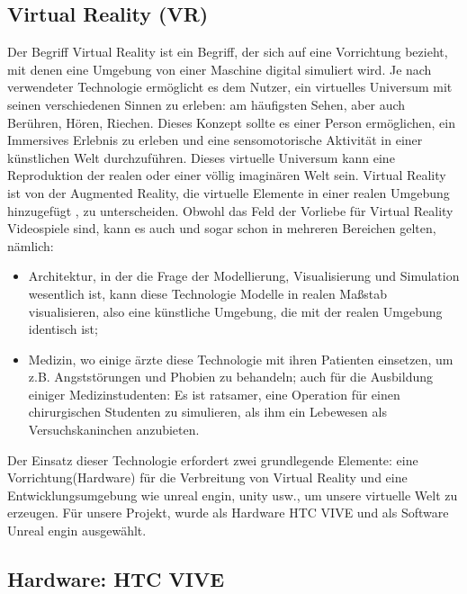 \subsection{Virtual Reality (VR)} \label{grund-vr}


Der Begriff Virtual Reality ist ein Begriff, der sich auf eine Vorrichtung bezieht, mit denen eine Umgebung von einer Maschine digital simuliert wird. 
Je nach verwendeter Technologie erm{\"o}glicht es dem Nutzer, ein virtuelles Universum mit seinen verschiedenen Sinnen zu erleben: 
am h{\"a}ufigsten Sehen, aber auch Ber{\"u}hren, H{\"o}ren, Riechen. 
Dieses Konzept sollte es einer Person erm{\"o}glichen, ein Immersives Erlebnis zu erleben und eine sensomotorische Aktivit{\"a}t in einer k{\"u}nstlichen Welt durchzuf{\"u}hren. 
Dieses virtuelle Universum kann eine Reproduktion der realen oder einer v{\"o}llig imagin{\"a}ren Welt sein. 
Virtual Reality ist von der Augmented Reality, die virtuelle Elemente in einer realen Umgebung hinzugef{\"u}gt , zu unterscheiden.
Obwohl das Feld der Vorliebe f{\"u}r Virtual Reality Videospiele sind, kann es auch und sogar schon in mehreren Bereichen gelten, n{\"a}mlich\cite{kolb18}:


\begin{itemize} \setlength\itemsep{-0.15cm}
  \item Architektur, in der die Frage der Modellierung, Visualisierung und Simulation wesentlich ist, kann diese Technologie Modelle in realen Ma{\ss}stab visualisieren, also eine k{\"u}nstliche Umgebung, die mit der realen Umgebung identisch ist;
  \item Medizin, wo einige {\"a}rzte diese Technologie mit ihren Patienten einsetzen, um z.B. Angstst{\"o}rungen und Phobien zu behandeln; auch f{\"u}r die Ausbildung einiger Medizinstudenten: Es ist ratsamer, eine Operation f{\"u}r einen chirurgischen Studenten zu simulieren, als ihm ein Lebewesen als Versuchskaninchen anzubieten.
\end{itemize}


Der Einsatz dieser Technologie erfordert zwei grundlegende Elemente: 
eine Vorrichtung(Hardware) f{\"u}r die Verbreitung von Virtual Reality und eine Entwicklungsumgebung wie unreal engin, unity usw., um unsere virtuelle Welt zu erzeugen. 
F{\"u}r unsere Projekt, wurde als Hardware HTC VIVE und als Software Unreal engin ausgew{\"a}hlt.




\subsection{Hardware: HTC VIVE} \label{vr-hardware}


